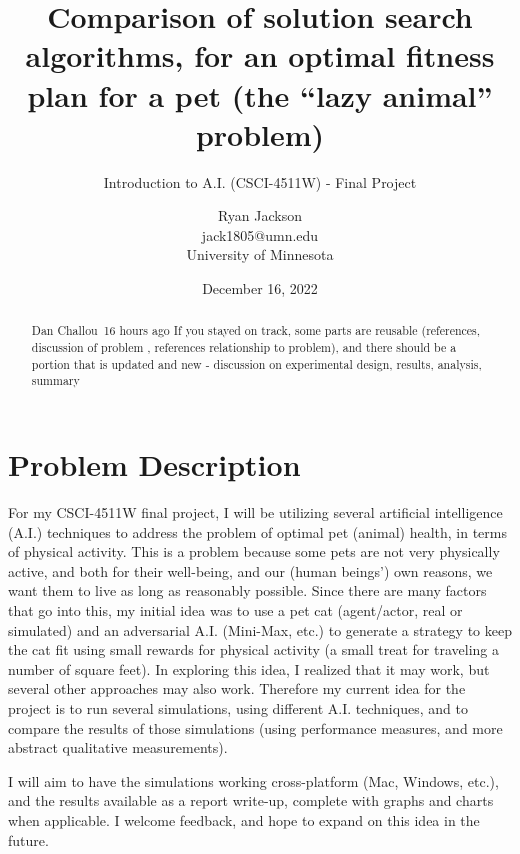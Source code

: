 \documentclass{article}
\title{Comparison of solution search algorithms, for an optimal fitness plan for a pet (the ``lazy animal'' problem)}
\subtitle{Introduction to A.I. (CSCI-4511W) - Final Project}
\author{Ryan Jackson \\ jack1805@umn.edu \\ University of Minnesota}
\date{December 16, 2022}
\begin{document}
\maketitle

\begin{abstract}
    Dan Challou 16 hours ago
If you stayed on track, some parts are reusable (references, discussion of problem , references relationship to problem), and there should be a  portion that is updated and new - discussion on experimental design, results, analysis, summary 
\end{abstract}

\section{Problem Description}

For my CSCI-4511W final project, I will be utilizing several artificial intelligence (A.I.) techniques to address the problem of optimal pet (animal) health, in terms of physical activity. This is a problem because some pets are not very physically active, and both for their well-being, and our (human beings') own reasons, we want them to live as long as reasonably possible. Since there are many factors that go into this, my initial idea was to use a pet cat (agent/actor, real or simulated) and an adversarial A.I. (Mini-Max, etc.) to generate a strategy to keep the cat fit using small rewards for physical activity (a small treat for traveling a number of square feet). In exploring this idea, I realized that it may work, but several other approaches may also work. Therefore my current idea for the project is to run several simulations, using different A.I. techniques, and to compare the results of those simulations (using performance measures, and more abstract qualitative measurements).

I will aim to have the simulations working cross-platform (Mac, Windows, etc.), and the results available as a report write-up, complete with graphs and charts when applicable. I welcome feedback, and hope to expand on this idea in the future.
\end{document}
